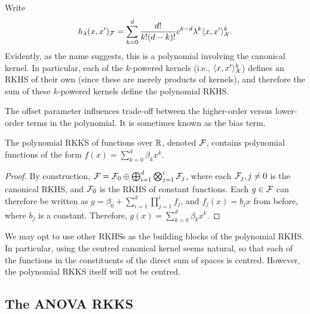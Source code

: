 Write
\begin{align*}
  h_\lambda(x,x')_{\mathcal F} = \sum_{k=0}^d \frac{d!}{k!(d-k)!} c^{k-d} \lambda^k \langle x,x'\rangle_{\mathcal X}^k.
\end{align*}
Evidently, as the name suggests, this is a polynomial involving the canonical kernel.
In particular, each of the $k$-powered kernels (i.e., $\langle x,x'\rangle_{\mathcal X}^k$) defines an RKHS of their own (since these are merely products of kernels), and therefore the sum of these $k$-powered kernels define the polynomial RKHS.

The offset parameter influences trade-off between the higher-order versus lower-order terms in the polynomial.
It is sometimes known as the bias term.

\begin{claim}
  The polynomial RKKS of functions over $\mathbb{R}$, denoted ${\mathcal F}$, contains polynomial functions of the form $f(x)=\sum_{k=0}^d \beta_k x^k$.
\end{claim}

\begin{proof}
  By construction, ${\mathcal F} = {\mathcal F}_0 \oplus \bigoplus_{i=1}^d\bigotimes_{j=1}^i {\mathcal F}_j$, where each ${\mathcal F}_j, j \neq 0$ is the canonical RKHS, and ${\mathcal F}_0$ is the RKHS of constant functions.
  Each $g \in {\mathcal F}$ can therefore be written as $g = \beta_0 + \sum_{i=1}^d\prod_{j=1}^i f_j$, and $f_j(x)= b_j x$ from before, where $b_j$ is a constant.
  Therefore, $g(x) = \sum_{k=0}^d \beta_k x^k$.
\end{proof}

\begin{remark}
  We may opt to use other RKHSs as the building blocks of the polynomial RKHS.
  In particular, using the centred canonical kernel seems natural, so that each of the functions in the constituents of the direct sum of spaces is centred.
  However, the polynomial RKKS itself will not be centred.
\end{remark}


\subsection{The ANOVA RKKS}

